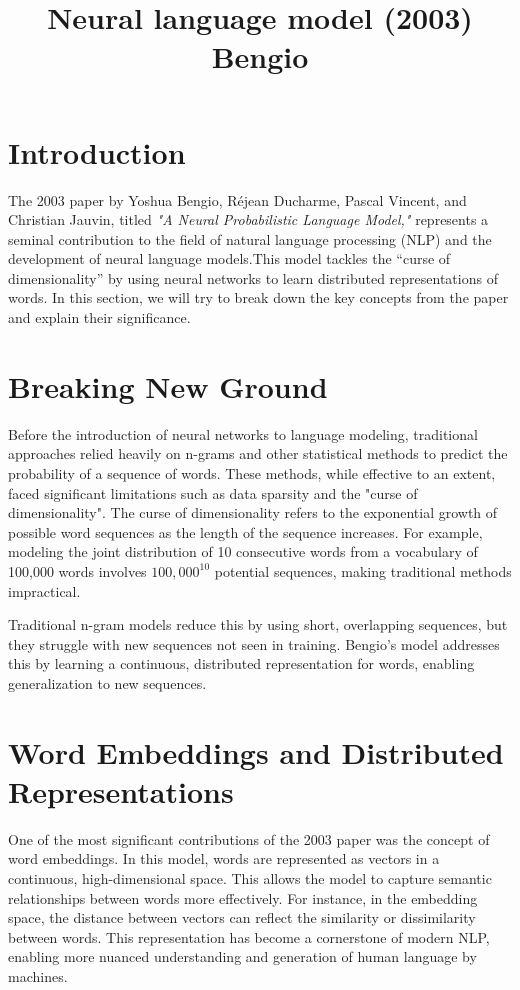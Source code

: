 \documentclass{article}
\begin{document}
\title{Neural language model (2003) Bengio}
\author{}
\date{}
\maketitle

\section*{Introduction}

The 2003 paper by Yoshua Bengio, Réjean Ducharme, Pascal Vincent, and Christian Jauvin, titled \textit{"A Neural Probabilistic Language Model,"} represents a seminal contribution to the field of natural language processing (NLP) and the development of neural language models.This model tackles the “curse of dimensionality” by using neural networks to learn distributed representations of words. In this section, we will try to break down the key concepts from the paper and explain their significance.

\section*{Breaking New Ground}

Before the introduction of neural networks to language modeling, traditional approaches relied heavily on n-grams and other statistical methods to predict the probability of a sequence of words. These methods, while effective to an extent, faced significant limitations such as data sparsity and the "curse of dimensionality". The curse of dimensionality refers to the exponential growth of possible word sequences as the length of the sequence increases. For example, modeling the joint distribution of 10 consecutive words from a vocabulary of 100,000 words involves $100,000^{10}$ potential sequences, making traditional methods impractical.

Traditional n-gram models reduce this by using short, overlapping sequences, but they struggle with new sequences not seen in training. Bengio’s model addresses this by learning a continuous, distributed representation for words, enabling generalization to new sequences.
\section*{Word Embeddings and Distributed Representations}

One of the most significant contributions of the 2003 paper was the concept of word embeddings. In this model, words are represented as vectors in a continuous, high-dimensional space. This allows the model to capture semantic relationships between words more effectively. For instance, in the embedding space, the distance between vectors can reflect the similarity or dissimilarity between words. This representation has become a cornerstone of modern NLP, enabling more nuanced understanding and generation of human language by machines.
\end{document}
